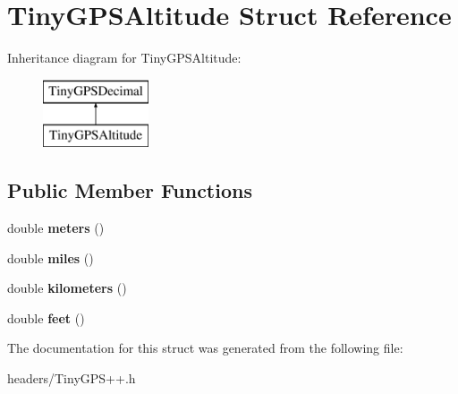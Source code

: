 \section{Tiny\+G\+P\+S\+Altitude Struct Reference}
\label{struct_tiny_g_p_s_altitude}
Inheritance diagram for Tiny\+G\+P\+S\+Altitude\+:\begin{figure}[H]
\begin{center}
\leavevmode
\includegraphics[height=2.000000cm]{struct_tiny_g_p_s_altitude}
\end{center}
\end{figure}
\subsection*{Public Member Functions}
\begin{DoxyCompactItemize}
\item 
double {\bfseries meters} ()\label{struct_tiny_g_p_s_altitude_a5a39d145bb1778814007206c765189f7}

\item 
double {\bfseries miles} ()\label{struct_tiny_g_p_s_altitude_a5ae68d990ea08d4e21cfa6aefb46cc03}

\item 
double {\bfseries kilometers} ()\label{struct_tiny_g_p_s_altitude_a1eb3e5b425784fc0db3e9ffe0f77f741}

\item 
double {\bfseries feet} ()\label{struct_tiny_g_p_s_altitude_ac782babc0c485d47e6f57384e88b8cc8}

\end{DoxyCompactItemize}


The documentation for this struct was generated from the following file\+:\begin{DoxyCompactItemize}
\item 
headers/Tiny\+G\+P\+S++.\+h\end{DoxyCompactItemize}
